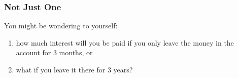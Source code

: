             \subsubsection{ Not Just One}
            \nopagebreak
            
        
        \label{m39332*id69658}You might be wondering to yourself:\par 
        \label{m39332*id69662}\begin{enumerate}[noitemsep, label=\textbf{\arabic*}. ] 
            \label{m39332*uid30}\item how much interest will you be paid if you only leave the money in the account for 3 months, or
\label{m39332*uid31}\item what if you leave it there for 3 years?
\end{enumerate}
        
